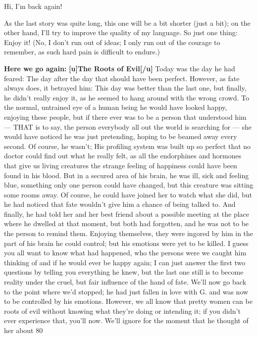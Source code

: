Hi, I'm back again!

As the last story was quite long, this one will be a bit shorter (just a bit); on the other hand, I'll try to improve the quality of my language. So just one thing: Enjoy it!
(No, I don't run out of ideas; I only run out of the courage to remember, as such hard pain is difficult to endure.)

\textbf{Here we go again:}
\textbf{[u]The Roots of Evil[/u]}
Today was the day he had feared: The day after the day that should have been perfect. However, as fate always does, it betrayed him: This day was better than the last one, but finally, he didn't really enjoy it, as he seemed to hang around with the wrong crowd. To the normal, untrained eye of a human being he would have looked happy, enjoying these people, but if there ever was to be a person that understood him --- THAT is to say, the person everybody all out the world is searching for --- she would have noticed he was just pretending, hoping to be beamed away every second. Of course, he wasn't; His profiling system was built up so perfect that no doctor could find out what he really felt, as all the endorphines and hormones that give us living creatures the strange feeling of happiness could have been found in his blood. But in a secured area of his brain, he was ill, sick and feeling blue, something only one person could have changed, but this creature was sitting some rooms away. Of course, he could have joined her to watch what she did, but he had noticed that fate wouldn't give him a chance of being talked to. And finally, he had told her and her best friend about a possible meeting at the place where he dwelled at that moment, but both had forgotten, and he was not to be the person to remind them. Enjoying themselves, they were ingored by him in the part of his brain he could control; but his emotions were yet to be killed. 
I guess you all want to know what had happened, who the persons were we caught him thinking of and if he would ever be happy again; I can just answer the first two questions by telling you everything he knew, but the last one still is to become reality under the cruel, but fair influence of the hand of fate. 
We'll now go back to the point where we'd stopped; he had just fallen in love with G. and was now to be controlled by his emotions. However, we all know that pretty women can be roots of evil without knowing what they're doing or intending it; if you didn't ever experience that, you'll now. 
We'll ignore for the moment that he thought of her about 80%

